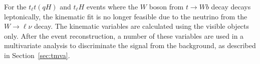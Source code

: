 For the  $t_{\ell}t(qH)$ and $t_{\ell}H$ events where the $W$ boson from $t\to W b$ decay decays leptonically,
the kinematic fit is no longer feasible due to the neutrino from the $W\rightarrow \ell\nu$ decay. The kinematic variables are calculated using the visible
objects only. After the event reconstruction, a number of these variables are used in a multivariate analysis to discriminate the signal from the background, as described in Section~\ref{sec:tmva}.



